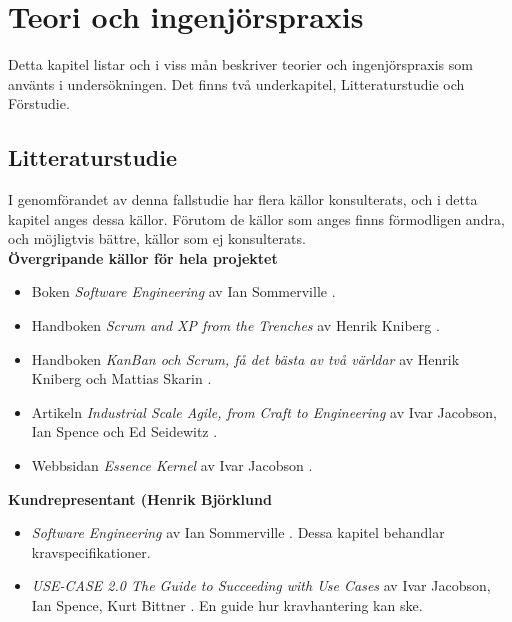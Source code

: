 \documentclass[conference,a4paper]{IEEEtran}
\begin{document}
\section{Teori och ingenjörspraxis} \label{sec:teori}
Detta kapitel listar och i viss mån beskriver teorier och ingenjörspraxis som använts i undersökningen. Det finns två underkapitel, Litteraturstudie och Förstudie.
\subsection{Litteraturstudie}
I genomförandet av denna fallstudie har flera källor konsulterats, och i detta kapitel anges dessa källor. Förutom de källor som anges finns förmodligen andra, och möjligtvis bättre, källor som ej konsulterats.\\

\noindent \textbf{Övergripande källor för hela projektet}
\begin{itemize}
\item Boken \textit{Software Engineering} av Ian Sommerville \cite[kap. 1,2,3]{Sommerville10}.
\\
\item Handboken \textit{Scrum and XP from the Trenches} av Henrik Kniberg \cite{Kniberg07}.
\\
\item Handboken \textit{KanBan och Scrum, få det bästa av två världar} av Henrik Kniberg och Mattias Skarin \cite{Kniberg10}.
\\
\item Artikeln \textit{Industrial Scale Agile, from Craft to Engineering} av Ivar Jacobson, Ian Spence och Ed Seidewitz \cite{Jacobson16}.
\\
\item Webbsidan \textit{Essence Kernel} av Ivar Jacobson \cite{ivarjacobson2017}.
\\
\end{itemize}

\noindent \textbf{Kundrepresentant (Henrik Björklund}
\begin{itemize}
\item \textit{Software Engineering} av Ian Sommerville \cite[kap. 4]{Sommerville10}. Dessa kapitel behandlar kravspecifikationer.
\item \textit{USE-CASE 2.0 The Guide to Succeeding with Use Cases} av Ivar Jacobson, Ian Spence, Kurt Bittner \cite{Jacobson11}. En guide hur kravhantering kan ske.
\\
\end{itemize}
\end{document}
